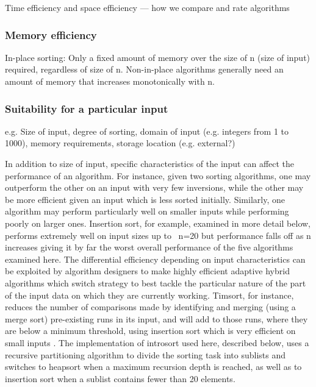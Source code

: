 \documentclass[12pt, a4paper]{article}
\begin{document}
Time efficiency and space efficiency --- how we compare and rate algorithms



\subsubsection{Memory efficiency}
In-place sorting: Only a fixed amount of memory over the size of n (size of input) required, regardless of size of n. Non-in-place algorithms generally need an amount of memory that increases monotonically with n.

\subsubsection{Suitability for a particular input}

e.g. Size of input, degree of sorting, domain of input (e.g. integers from 1 to 1000), memory requirements, storage location (e.g. external?)

In addition to size of input, specific characteristics of the input can affect the performance of an algorithm. For instance, given two sorting algorithms, one may outperform the other on an input with very few inversions, while the other may be more efficient given an input which is less sorted initially. Similarly, one algorithm may perform particularly well on smaller inputs while performing poorly on larger ones. Insertion sort, for example, examined in more detail below, performs extremely well on input sizes up to ~n=20 but performance falls off as n increases giving it by far the worst overall performance of the five algorithms examined here. The differential efficiency depending on input characteristics can be exploited by algorithm designers to make highly efficient adaptive hybrid algorithms which switch strategy to best tackle the particular nature of the part of the input data on which they are currently working. Timsort, for instance, reduces the number of comparisons made by identifying and merging (using a merge sort) pre-existing runs in its input, and will add to those runs, where they are below a minimum threshold, using insertion sort which is very efficient on small inputs \autocite{enwiki:997404113}. The implementation of introsort used here, described below, uses a recursive partitioning algorithm to divide the sorting task into sublists and switches to heapsort when a maximum recursion depth is reached, as well as to insertion sort when a sublist contains fewer than 20 elements.
\end{document}
